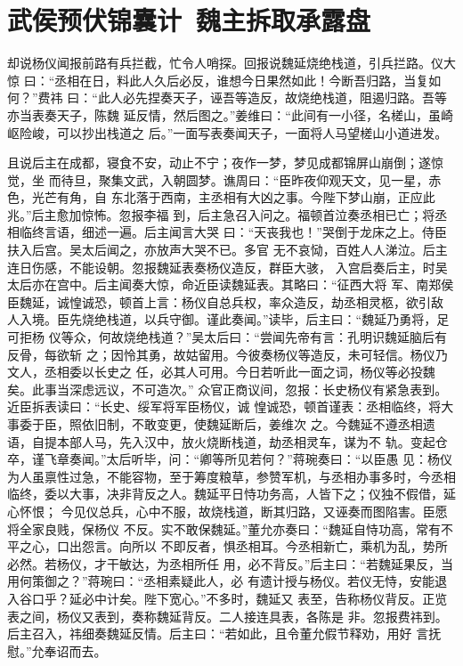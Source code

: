 \chapter{武侯预伏锦囊计~魏主拆取承露盘}

却说杨仪闻报前路有兵拦截，忙令人哨探。回报说魏延烧绝栈道，引兵拦路。仪大惊
曰：“丞相在日，料此人久后必反，谁想今日果然如此！今断吾归路，当复如何？”费祎
曰：“此人必先捏奏天子，诬吾等造反，故烧绝栈道，阻遏归路。吾等亦当表奏天子，陈魏
延反情，然后图之。”姜维曰：“此间有一小径，名槎山，虽崎岖险峻，可以抄出栈道之
后。”一面写表奏闻天子，一面将人马望槎山小道进发。

且说后主在成都，寝食不安，动止不宁；夜作一梦，梦见成都锦屏山崩倒；遂惊觉，坐
而待旦，聚集文武，入朝圆梦。谯周曰：“臣昨夜仰观天文，见一星，赤色，光芒有角，自
东北落于西南，主丞相有大凶之事。今陛下梦山崩，正应此兆。”后主愈加惊怖。忽报李福
到，后主急召入问之。福顿首泣奏丞相已亡；将丞相临终言语，细述一遍。后主闻言大哭
曰：“天丧我也！”哭倒于龙床之上。侍臣扶入后宫。吴太后闻之，亦放声大哭不已。多官
无不哀恸，百姓人人涕泣。后主连日伤感，不能设朝。忽报魏延表奏杨仪造反，群臣大骇，
入宫启奏后主，时吴太后亦在宫中。后主闻奏大惊，命近臣读魏延表。其略曰：“征西大将
军、南郑侯臣魏延，诚惶诚恐，顿首上言：杨仪自总兵权，率众造反，劫丞相灵柩，欲引敌
人入境。臣先烧绝栈道，以兵守御。谨此奏闻。”读毕，后主曰：“魏延乃勇将，足可拒杨
仪等众，何故烧绝栈道？”吴太后曰：“尝闻先帝有言：孔明识魏延脑后有反骨，每欲斩
之；因怜其勇，故姑留用。今彼奏杨仪等造反，未可轻信。杨仪乃文人，丞相委以长史之
任，必其人可用。今日若听此一面之词，杨仪等必投魏矣。此事当深虑远议，不可造次。”
众官正商议间，忽报：长史杨仪有紧急表到。近臣拆表读曰：“长史、绥军将军臣杨仪，诚
惶诚恐，顿首谨表：丞相临终，将大事委于臣，照依旧制，不敢变更，使魏延断后，姜维次
之。今魏延不遵丞相遗语，自提本部人马，先入汉中，放火烧断栈道，劫丞相灵车，谋为不
轨。变起仓卒，谨飞章奏闻。”太后听毕，问：“卿等所见若何？”蒋琬奏曰：“以臣愚
见：杨仪为人虽禀性过急，不能容物，至于筹度粮草，参赞军机，与丞相办事多时，今丞相
临终，委以大事，决非背反之人。魏延平日恃功务高，人皆下之；仪独不假借，延心怀恨；
今见仪总兵，心中不服，故烧栈道，断其归路，又诬奏而图陷害。臣愿将全家良贱，保杨仪
不反。实不敢保魏延。”董允亦奏曰：“魏延自恃功高，常有不平之心，口出怨言。向所以
不即反者，惧丞相耳。今丞相新亡，乘机为乱，势所必然。若杨仪，才干敏达，为丞相所任
用，必不背反。”后主曰：“若魏延果反，当用何策御之？”蒋琬曰：“丞相素疑此人，必
有遗计授与杨仪。若仪无恃，安能退入谷口乎？延必中计矣。陛下宽心。”不多时，魏延又
表至，告称杨仪背反。正览表之间，杨仪又表到，奏称魏延背反。二人接连具表，各陈是
非。忽报费祎到。后主召入，祎细奏魏延反情。后主曰：“若如此，且令董允假节释劝，用好
言抚慰。”允奉诏而去。

